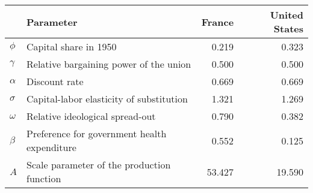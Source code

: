 
\begin{tabular}{llrr}
\toprule
\textbf{} & \textbf{Parameter} & \textbf{France} & \textbf{United States}\\
\midrule
$\phi$ & Capital share in 1950 & 0.219 & 0.323\\
$\gamma$ & Relative bargaining power of the union & 0.500 & 0.500\\
$\alpha$ & Discount rate & 0.669 & 0.669\\
$\sigma$ & Capital-labor elasticity of substitution & 1.321 & 1.269\\
$\omega$ & Relative ideological spread-out & 0.790 & 0.382\\
$\beta$ & Preference for government health expenditure & 0.552 & 0.125\\
$A$ & Scale parameter of the production function & 53.427 & 19.590\\
\bottomrule
\end{tabular}
